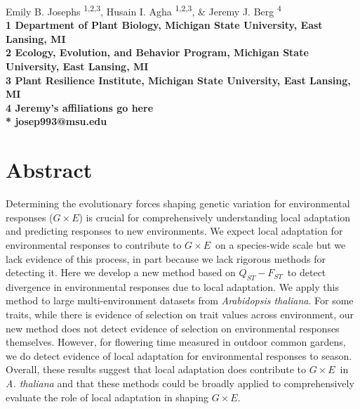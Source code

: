 \documentclass[11pt,letterpaper]{article}
\newcommand{\gxe}{$G \times E$}
\newcommand{\qf}{$Q_{ST}-F_{ST}$}
\begin{document}
\begin{flushleft}
\textbf\newline
{\Large
\textbf{}
}
\newline



Emily B. Josephs \textsuperscript{1,2,3},
Husain I. Agha \textsuperscript{1,2,3}, \&
Jeremy J. Berg \textsuperscript{4}
\\
\bigskip
\bf{1} Department of Plant Biology, Michigan State University, East Lansing, MI
\\
\bf{2} Ecology, Evolution, and Behavior Program, Michigan State University, East Lansing, MI
\\
\bf{3} Plant Resilience Institute, Michigan State University, East Lansing, MI
\\
\bf{4} Jeremy's affiliations go here
\\
\bigskip
* josep993@msu.edu
\end{flushleft}


\linenumbers

\section*{Abstract}
Determining the evolutionary forces shaping genetic variation for environmental responses (\gxe) is crucial for comprehensively understanding local adaptation and predicting responses to new environments. 
We expect local adaptation for environmental responses to contribute to \gxe\ on a species-wide scale but we lack evidence of this process, in part because we lack rigorous methods for detecting it.
Here we develop a new method based on \qf\ to detect divergence in environmental responses due to local adaptation.
We apply this method to large multi-environment datasets from \textit{Arabidopsis thaliana}.
For some traits, while there is evidence of selection on trait values across environment, our new method does not detect evidence of selection on environmental responses themselves.
However, for flowering time measured in outdoor common gardens, we do detect evidence of local adaptation for environmental responses to season.
Overall, these results suggest that local adaptation does contribute to \gxe\ in \textit{A. thaliana} and that these methods could be broadly applied to comprehensively evaluate the role of local adaptation in shaping \gxe.
\end{document}
